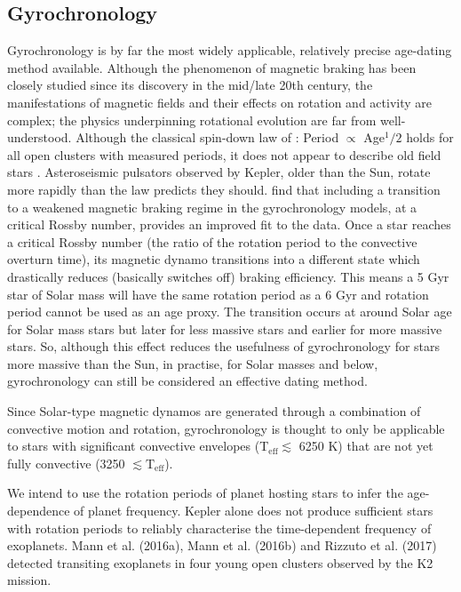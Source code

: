 \documentclass[useAMS, usenatbib, preprint, 12pt]{aastex}
\begin{document}
\subsection{Gyrochronology}

Gyrochronology is by far the most widely applicable, relatively precise
age-dating method available.
Although the phenomenon of magnetic braking has been closely studied since its
discovery in the mid/late 20th century, the manifestations of magnetic fields
and their effects on rotation and activity are complex; the physics
underpinning rotational evolution are far from well-understood.
Although the classical spin-down law of \citet{skumanich1972}: Period
$\propto$ Age$^1/2$ holds for all open clusters with measured periods, it does
not appear to describe old field stars \citep{angus2015, vansaders2016}.
Asteroseismic pulsators observed by Kepler, older than the Sun, rotate more
rapidly than the \citet{skumanich1972} law predicts they should.
\citet{vansaders2016} find that including a transition to a weakened magnetic
braking regime in the gyrochronology models, at a critical Rossby number,
provides an improved fit to the data.
Once a star reaches a critical Rossby number (the ratio of the rotation
period to the convective overturn time), its magnetic dynamo transitions into
a different state which drastically reduces (basically switches off) braking
efficiency.
This means a 5 Gyr star of Solar mass will have the same rotation period as a
6 Gyr and rotation period cannot be used as an age proxy.
The transition occurs at around Solar age for Solar mass stars but later for
less massive stars and earlier for more massive stars.
So, although this effect reduces the usefulness of gyrochronology for stars
more massive than the Sun, in practise, for Solar masses and below,
gyrochronology can still be considered an effective dating method.

Since Solar-type magnetic dynamos are generated through a combination of
convective motion and rotation, gyrochronology is thought to only be
applicable to stars with significant convective envelopes (T$_{\mathrm{eff}}
\lesssim$ 6250 K) that are not yet fully convective (3250 $\lesssim \mathrm{T}
_{\mathrm{eff}}$).

We intend to use the rotation periods of planet hosting stars to infer the
age-dependence of planet frequency. Kepler alone does not produce sufficient
stars with rotation periods to reliably characterise the time-dependent
frequency of exoplanets.
Mann et al. (2016a), Mann et al. (2016b) and Rizzuto et al. (2017) detected
transiting exoplanets in four young open clusters observed by the K2 mission.
\end{document}

